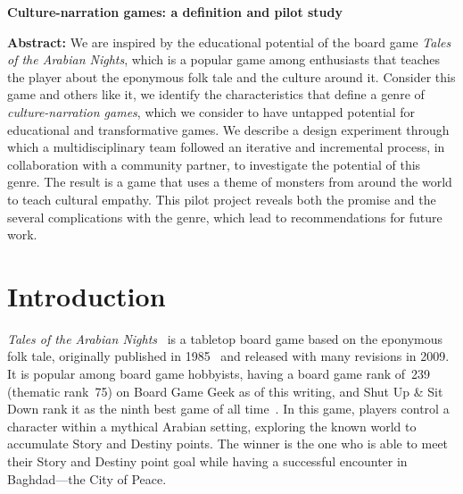 \documentclass[a4paper]{article}
\newcommand{\projecttitle}{Culture-narration games: a definition and pilot study}
\begin{document}
\begin{center}
\fontsize{14}{16.8}\selectfont
\bf \projecttitle
\end{center}

\vspace{-0.25in}
\begin{center}
\iftoggle{blind}{
}{
Paul Gestwicki, Kaley Rittichier, and Austin DeArmond, Ball State University\\
pvgestwicki@bsu.edu, kjrittichier@bsu.edu, ajdearmond@bsu.edu\\
}
\end{center}

\newcommand{\totan}{\textit{TotAN}}
\newcommand{\smersh}{\textit{SMERSH}}
\newcommand{\figwidth}{2.5in}

%
\begin{adjustwidth}{0.5in}{0.5in}
  \textbf{Abstract:} We are inspired by the educational potential of
  the board game \textit{Tales of the Arabian Nights}, which is a
  popular game among enthusiasts that teaches the player about the
  eponymous folk tale and the culture around it. Consider this game
  and others like it, we identify the characteristics that define a
  genre of \textit{culture-narration games}, which we consider to have
  untapped potential for educational and transformative games.
  We describe a design experiment through which a multidisciplinary team
  followed an iterative and incremental process, in collaboration
  with a community partner, to investigate the potential of this genre.
  The result is a game that uses a theme of monsters from around the
  world to teach cultural empathy.
  This pilot project reveals both the promise and the several complications
  with the genre, which lead to recommendations for future work.
\end{adjustwidth}

\section{Introduction}


\textit{Tales of the Arabian Nights}~\citep{Goldberg2009} is a 
tabletop board game based on the eponymous folk tale,
originally published in 1985~\citep{Goldberg1985} and
released with many revisions in 2009.
It is popular among board game hobbyists, having a board game
rank of~239 (thematic rank~75) on Board Game Geek as of this writing,
and Shut Up \& Sit Down rank it as the ninth best game of all 
time~\citep{ShutUp2015}.
In this game, players control a character within a mythical Arabian
setting, exploring the known world to accumulate Story and
Destiny points. The winner is the one who is able to meet their 
Story and Destiny point goal while having a successful encounter
in Baghdad---the City of Peace. 
\end{document}
